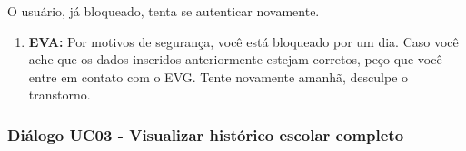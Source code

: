 \begin{itemize}
        O usuário, já bloqueado, tenta se autenticar novamente.
        \begin{enumerate}
            \item \textbf{EVA:} Por motivos de segurança, você está bloqueado por um dia. Caso você ache que os dados inseridos anteriormente estejam corretos, peço que você entre em contato com o EVG. Tente novamente amanhã, desculpe o transtorno.
        \end{enumerate}
    
\end{itemize}

\subsubsection{Diálogo UC03 - Visualizar histórico escolar completo}

